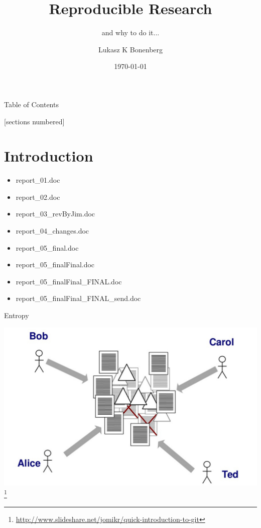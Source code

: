 \documentclass[11pt]{beamer}
\title[RR]{Reproducible Research}
\subtitle{and why to do it...}
\author{Lukasz K Bonenberg}
\institute{NGI}
\date{\today}
\begin{document}
\maketitle

\begin{frame}{Table of Contents\thisDocRef}

  [sections numbered]
  \tableofcontents[hideallsubsections]
\end{frame}


\section{Introduction}


\begin{frame}{}%

	\begin{exampleblock}{}
\begin{itemize}
	\item report\_01.doc
	\item report\_02.doc
	\item report\_03\_revByJim.doc
	\item report\_04\_changes.doc
	\item report\_05\_final.doc
	\item report\_05\_finalFinal.doc
	\item report\_05\_finalFinal\_FINAL.doc
	\item report\_05\_finalFinal\_FINAL\_send.doc

\end{itemize}
	\end{exampleblock}

\end{frame}

\begin{frame}{Entropy}%

\centering
\includegraphics[width=\textwidth]{pic/disaster.jpg}\footnote{\url{http://www.slideshare.net/jomikr/quick-introduction-to-git}}

\end{frame}
\end{document}
